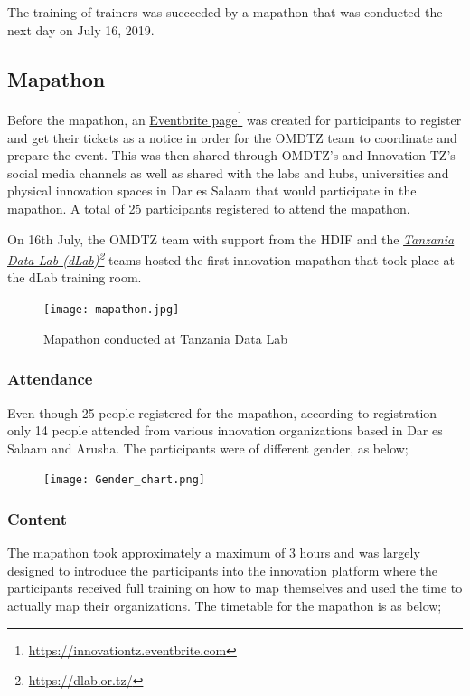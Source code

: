 \documentclass[a4paper,12pt,twoside]{article}
\begin{document}
The training of trainers was succeeded by a mapathon that was conducted the next day on July 16, 2019.

\subsection{Mapathon}
Before the mapathon, an \href{https://innovationtz.eventbrite.com}{Eventbrite page}\footnote{\url{https://innovationtz.eventbrite.com}} was created for participants to register and get their tickets as a notice in order for the OMDTZ team to coordinate and prepare the event. This was then shared through OMDTZ’s and Innovation TZ’s social media channels as well as shared with the labs and hubs, universities and physical innovation spaces in Dar es Salaam that would participate in the mapathon. A total of 25 participants registered to attend the mapathon.

On 16th July, the OMDTZ team with support from the HDIF and the \textit{\href{https://dlab.or.tz/}{Tanzania Data Lab (dLab)}\footnote{\url{https://dlab.or.tz/}}} teams hosted the first innovation mapathon that took place at the dLab training room. 

\begin{figure}[H]
	\centering
	\texttt{[image: mapathon.jpg]}
	\caption{Mapathon conducted at Tanzania Data Lab}
\end{figure}

\subsubsection{Attendance}
Even though 25 people registered for the mapathon, according to registration only 14 people attended from various innovation organizations based in Dar es Salaam and Arusha. The participants were of different gender, as below;

\begin{figure}[h]
	\centering
	\texttt{[image: Gender\_chart.png]}
\end{figure}

\subsubsection{Content}
The mapathon took approximately a maximum of 3 hours and was largely designed to introduce the participants into the innovation platform where the participants received full training on how to map themselves and used the time to actually map their organizations. The timetable for the mapathon is as below;
\end{document}
